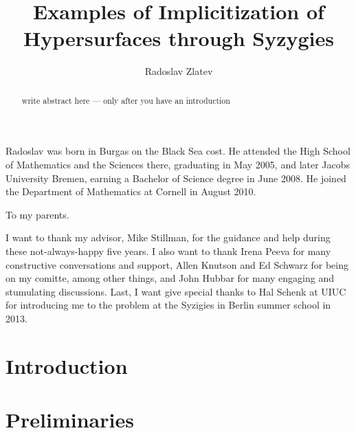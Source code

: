 \documentclass[phd,tocprelim]{cornell}
\title {Examples of Implicitization of Hypersurfaces through Syzygies}
\author {Radoslav Zlatev}
\numberwithin{first}{chapter}
\begin{document}
\maketitle
\makecopyright

\begin{abstract}
write abstract here --- only after you have an introduction
\end{abstract}

\begin{biosketch}
Radoslav was born in Burgas on the Black Sea cost.
He attended the High School of Mathematics and the Sciences there, graduating in May 2005,
and later Jacobs University Bremen, earning a Bachelor of Science degree in June 2008.
He joined the Department of Mathematics at Cornell in August 2010.
\end{biosketch}

\begin{dedication}
To my parents.

\end{dedication}

\begin{acknowledgements}
I want to thank my advisor, Mike Stillman, for the guidance and help during these not-always-happy five years.
I also want to thank Irena Peeva for many constructive conversations and support, Allen Knutson and Ed Schwarz
for being on my comitte, among other things, and John Hubbar for many engaging and stumulating discussions.
Last, I want give special thanks to Hal Schenk at UIUC for introducing me to the problem at the Syzigies in Berlin
summer school in 2013.
\end{acknowledgements}

\contentspage
\tablelistpage
\figurelistpage

\normalspacing \setcounter{page}{1} 
\pagestyle{cornell} \addtolength{\parskip}{0.5\baselineskip}


\chapter{Introduction}
\label{ch:intro}


\chapter{Preliminaries}
\label{ch:preliminaries}

\end{document}
